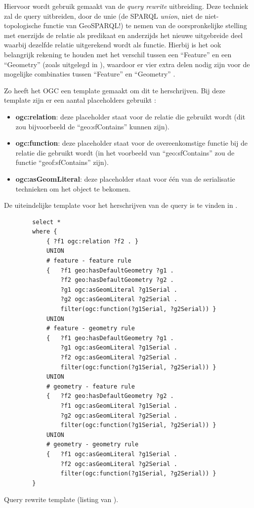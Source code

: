 Hiervoor wordt gebruik gemaakt van de \textit{query rewrite} uitbreiding. Deze techniek zal de query uitbreiden, door de unie (de SPARQL \textit{union}, niet de niet-topologische functie van GeoSPARQL!) te nemen van de oorspronkelijke stelling met enerzijds de relatie als predikaat en anderzijds het nieuwe uitgebreide deel waarbij dezelfde relatie uitgerekend wordt als functie. Hierbij is het ook belangrijk rekening te houden met het verschil tussen een ``Feature'' en een ``Geometry'' (zoals uitgelegd in ), waardoor er vier extra delen nodig zijn voor de mogelijke combinaties tussen ``Feature'' en ``Geometry'' \cite{ogcdocs}. 

Zo heeft het OGC een template gemaakt om dit te herschrijven. Bij deze template zijn er een aantal placeholders gebruikt \cite{ogcdocs}:
\begin{itemize}
    \item \textbf{ogc:relation}: deze placeholder staat voor de relatie die gebruikt wordt (dit zou bijvoorbeeld de ``geo:sfContains'' kunnen zijn).
    \item \textbf{ogc:function}: deze placeholder staat voor de overeenkomstige functie bij de relatie die gebruikt wordt (in het voorbeeld van ``geo:sfContains'' zou de functie ``geof:sfContains'' zijn).
    \item \textbf{ogc:asGeomLiteral}: deze placeholder staat voor één van de serialisatie technieken om het object te bekomen.
\end{itemize}

De uiteindelijke template voor het herschrijven van de query is te vinden in .

\begin{listing}[ht]
    \begin{verbatim}
        select *
        where {
            { ?f1 ogc:relation ?f2 . }
            UNION
            # feature - feature rule
            {   ?f1 geo:hasDefaultGeometry ?g1 . 
                ?f2 geo:hasDefaultGeometry ?g2 .
                ?g1 ogc:asGeomLiteral ?g1Serial .
                ?g2 ogc:asGeomLiteral ?g2Serial .
                filter(ogc:function(?g1Serial, ?g2Serial)) }
            UNION
            # feature - geometry rule
            {   ?f1 geo:hasDefaultGeometry ?g1 . 
                ?g1 ogc:asGeomLiteral ?g1Serial .
                ?f2 ogc:asGeomLiteral ?g2Serial .
                filter(ogc:function(?g1Serial, ?g2Serial)) }
            UNION
            # geometry - feature rule
            {   ?f2 geo:hasDefaultGeometry ?g2 .
                ?f1 ogc:asGeomLiteral ?g1Serial .
                ?g2 ogc:asGeomLiteral ?g2Serial .
                filter(ogc:function(?g1Serial, ?g2Serial)) }
            UNION
            # geometry - geometry rule
            {   ?f1 ogc:asGeomLiteral ?g1Serial .
                ?f2 ogc:asGeomLiteral ?g2Serial .
                filter(ogc:function(?g1Serial, ?g2Serial)) }
        }
    \end{verbatim}
    \caption{Query rewrite template (listing van \cite{ogcdocs}).}
    \label{listing:geosparql_rewrite_query}
\end{listing}